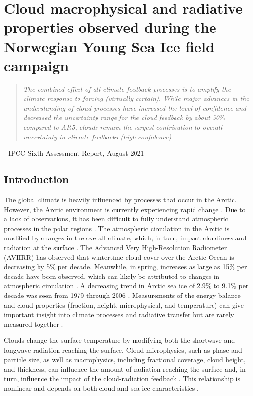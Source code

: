 \chapter{Cloud macrophysical and radiative properties observed during the Norwegian Young Sea Ice field campaign}
\vspace{1 cm}
\begin{spacing}{1} \begin{quote} 
\noindent \emph{The combined effect of all climate feedback processes is to amplify the climate response to forcing (virtually certain). While major advances in the understanding of cloud processes have increased the level of confidence and decreased the uncertainty range for the cloud feedback by about 50$\%$ compared to AR5, clouds remain the largest contribution to overall uncertainty in climate feedbacks (high confidence).} \end{quote}
\hspace{6 cm} - IPCC Sixth Assessment Report, August 2021  
\end{spacing}
\doublespacing
\section{Introduction}
The global climate is heavily influenced by processes that occur in the Arctic. However, the Arctic environment is currently experiencing rapid change \citep{overland:2011, stroeve:2007}. Due to a lack of observations, it has been difficult to fully understand atmospheric processes in the polar regions \citep{persson:2002}. The atmospheric circulation in the Arctic is modified by changes in the overall climate, which, in turn, impact cloudiness and radiation at the surface \citep{zhang:2008}. The Advanced Very High-Resolution Radiometer (AVHRR) has observed that wintertime cloud cover over the Arctic Ocean is decreasing by 5$\%$ per decade. Meanwhile, in spring, increases as large as 15$\%$ per decade have been observed, which can likely be attributed to changes in atmospheric circulation \citep{schweiger:2004}. A decreasing trend in Arctic sea ice of 2.9$\%$ to 9.1$\%$ per decade was seen from 1979 through 2006 \citep{stroeve:2007}. Measurements of the energy balance and cloud properties (fraction, height, microphysical, and temperature) can give important insight into climate processes and radiative transfer but are rarely measured together \citep{persson:2002, schweiger:2004, miller:2017}. 

Clouds change the surface temperature by modifying both the shortwave and longwave radiation reaching the surface. Cloud microphysics, such as phase and particle size, as well as macrophysics, including fractional coverage, cloud height, and thickness, can influence the amount of radiation reaching the surface and, in turn, influence the impact of the cloud-radiation feedback \citep{uttal:2002}. This relationship is nonlinear and depends on both cloud and sea ice characteristics \citep{intrieri:2002}.

